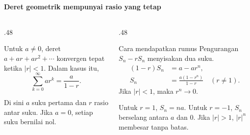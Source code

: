 \documentclass{../../kalkulus-ppt}
\begin{document}
\begin{frame}{\insertsection}
    \framesubtitle{Deret geometrik mempunyai rasio yang tetap}
    \begin{columns}[T,onlytextwidth]
        \begin{column}{.48\textwidth}
            \begin{teorema}
                Untuk $a\ne0$, deret
                $a+ar+ar^2+\cdots$ konvergen tepat ketika $|r|<1$.
                Dalam kasus itu,
                \[
                    \sum_{k=0}^{\infty}ar^k=\frac{a}{1-r}.
                \]
            \end{teorema}
            Di sini $a$ suku pertama dan $r$ rasio antar suku.
            Jika $a=0$, setiap suku bernilai nol.
        \end{column}
        \begin{column}{.48\textwidth}
            \begin{block}{Cara mendapatkan rumus}
                Pengurangan $S_n-rS_n$ menyisakan dua suku.
                \[
                    \begin{aligned}
                        (1-r)S_n&=a-ar^n,\\
                        S_n&=\frac{a(1-r^n)}{1-r}\quad (r\ne1).
                    \end{aligned}
                \]
                Jika $|r|<1$, maka $r^n\to0$.
            \end{block}
            Untuk $r=1$, $S_n=na$. Untuk $r=-1$, $S_n$
            berselang antara $a$ dan $0$. Jika $|r|>1$,
            $|r|^n$ membesar tanpa batas.
        \end{column}
    \end{columns}
\end{frame}
\end{document}
